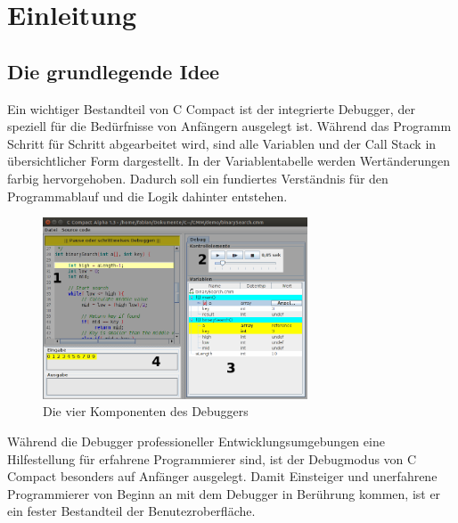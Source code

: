 

\section{Einleitung}


\subsection{Die grundlegende Idee}
Ein wichtiger Bestandteil von C Compact ist der integrierte Debugger, der speziell für die Bedürfnisse von Anfängern ausgelegt ist. Während das Programm Schritt für Schritt abgearbeitet wird, sind alle Variablen und der Call Stack in übersichtlicher Form dargestellt. In der Variablentabelle werden Wertänderungen farbig hervorgehoben. Dadurch soll ein fundiertes Verständnis für den Programmablauf und die Logik dahinter entstehen.

\begin{figure}[h]
\centering
\includegraphics[width=0.7\textwidth]{./media/images/gui/debugger/gui-debugger-marked.png}
\caption{Die vier Komponenten des Debuggers}
\label{fig:deb-intro-m1}
\end{figure}

Während die Debugger professioneller Entwicklungsumgebungen eine Hilfestellung für erfahrene Programmierer sind, ist der Debugmodus von C Compact besonders auf Anfänger ausgelegt. Damit Einsteiger und unerfahrene Programmierer von Beginn an mit dem Debugger in Berührung kommen, ist er ein fester Bestandteil der Benutezroberfläche.

